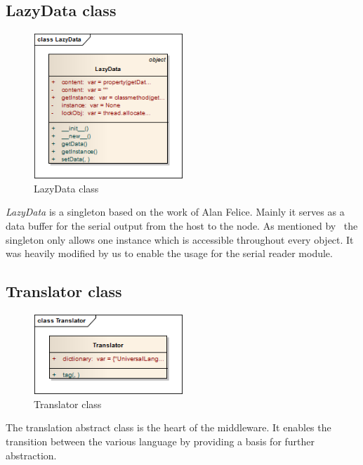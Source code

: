\newpage
\subsection{LazyData class}
\begin{figure}[H]
   \centering
   \includegraphics[width=0.5\textwidth]{pic/LazyData.png}%
   \caption{LazyData class}
   \label{LazyDatapic}%
\end{figure}

\textit{LazyData} is a singleton based on the work of Alan Felice. Mainly it serves as a data buffer for the serial output from the host to the node. 
As mentioned by~\cite{GammaHelmJohnsonVlissides199711} the singleton only allows one instance which is accessible throughout every object. It was
heavily modified by us to enable the usage for the serial reader module.

\newpage
\subsection{Translator class}
\begin{figure}[H]
   \centering
   \includegraphics[width=0.5\textwidth]{pic/Translator.png}%
   \caption{Translator class}
   \label{Translatorpic}%
\end{figure}

The translation abstract class is the heart of the middleware. It enables the transition between the various language by providing a basis for further 
abstraction.

